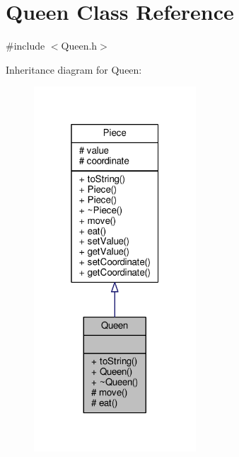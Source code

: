 \hypertarget{class_queen}{}\section{Queen Class Reference}
\label{class_queen}


{\ttfamily \#include $<$Queen.\+h$>$}



Inheritance diagram for Queen\+:\nopagebreak
\begin{figure}[H]
\begin{center}
\leavevmode
\includegraphics[width=172pt]{class_queen__inherit__graph}
\end{center}
\end{figure}


